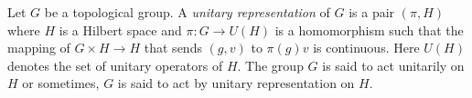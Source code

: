 \documentclass[12pt]{article}
\begin{document}
Let $G$ be a topological group. A \emph{unitary representation} of $G$
is a pair $(\pi, H)$ where $H$ is a Hilbert space and 
$\pi: G \to U(H)$ is a homomorphism such that
the mapping of $G \times H \to H$ that sends $(g,v)$ to $\pi(g)v$
is continuous. Here $U(H)$ denotes the set of unitary operators
of $H$.
The group $G$ is said to act unitarily on $H$ or sometimes, 
$G$ is said to act by unitary representation on $H$.

\end{document}
